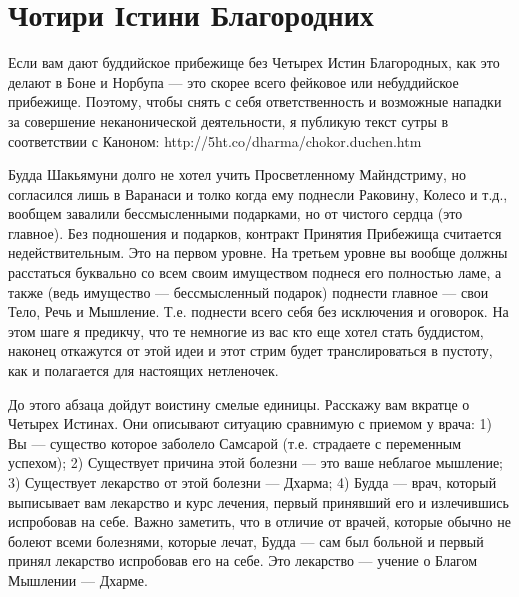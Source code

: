 \section{Чотири Істини Благородних}

Если вам дают буддийское прибежище без Четырех Истин Благородных,
как это делают в Боне и Норбупа — это скорее всего фейковое или
небуддийское прибежище. Поэтому, чтобы снять с себя ответственность
и возможные нападки за совершение неканонической деятельности,
я публикую текст сутры в соответствии с Каноном: http://5ht.co/dharma/chokor.duchen.htm

Будда Шакьямуни долго не хотел учить Просветленному Майндстриму,
но согласился лишь в Варанаси и толко когда ему поднесли Раковину,
Колесо и т.д., вообщем завалили бессмысленными подарками,
но от чистого сердца (это главное). Без подношения и подарков,
контракт Принятия Прибежища считается недействительным. Это на
первом уровне. На третьем уровне вы вообще должны расстаться
буквально со всем своим имуществом поднеся его полностью ламе,
а также (ведь имущество — бессмысленный подарок) поднести
главное — свои Тело, Речь и Мышление. Т.е. поднести всего
себя без исключения и оговорок. На этом шаге я предикчу, что
те немногие из вас кто еще хотел стать буддистом, наконец откажутся
от этой идеи и этот стрим будет транслироваться в пустоту, как и
полагается для настоящих нетленочек.

До этого абзаца дойдут воистину смелые единицы. Расскажу вам
вкратце о Четырех Истинах. Они описывают ситуацию сравнимую
с приемом у врача: 1) Вы — существо которое заболело Самсарой (т.е.
страдаете с переменным успехом); 2) Существует причина этой
болезни — это ваше неблагое мышление; 3) Существует лекарство
от этой болезни — Дхарма; 4) Будда — врач, который выписывает
вам лекарство и курс лечения, первый принявший его и излечившись
испробовав на себе. Важно заметить, что в отличие от врачей,
которые обычно не болеют всеми болезнями, которые лечат,
Будда — сам был больной и первый принял лекарство испробовав
его на себе. Это лекарство — учение о Благом Мышлении — Дхарме. 

